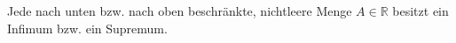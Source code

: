 Jede nach unten bzw. nach oben beschränkte, nichtleere Menge $A \in \mathbb{R}$ besitzt ein Infimum bzw. ein Supremum.